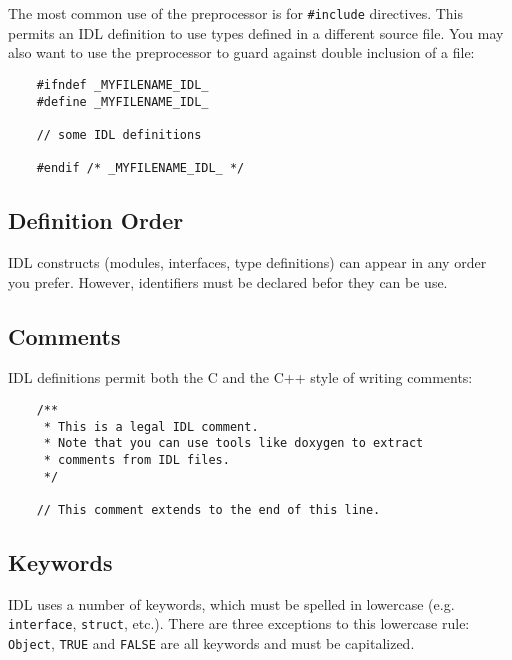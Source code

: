 The most common use of the preprocessor is for {\tt \#include} directives. This
permits an IDL definition to use types defined in a different source file.
You may also want to use the preprocessor to guard against double inclusion of a
file:
\begin{verbatim}
    #ifndef _MYFILENAME_IDL_
    #define _MYFILENAME_IDL_
    
    // some IDL definitions

    #endif /* _MYFILENAME_IDL_ */
\end{verbatim}


\subsection{Definition Order}
IDL constructs (modules, interfaces, type definitions) can appear in any order
you prefer.
However, identifiers must be declared befor they can be use.


\subsection{Comments}
IDL definitions permit both the C and the C++ style of writing comments:
\begin{verbatim}
    /**
     * This is a legal IDL comment.
     * Note that you can use tools like doxygen to extract
     * comments from IDL files.
     */

    // This comment extends to the end of this line.
\end{verbatim}


\subsection{Keywords}
IDL uses a number of keywords, which must be spelled in lowercase (e.g. {\tt
interface}, {\tt struct}, etc.).
There are three exceptions to this lowercase rule: {\tt Object}, {\tt TRUE} and
{\tt FALSE} are all keywords and must be capitalized.

